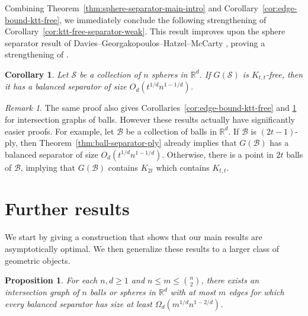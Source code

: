 \documentclass[11pt, reqno]{amsart}
\theoremstyle{plain}
\newtheorem{corollary}[theorem]{Corollary}
\newtheorem{proposition}[theorem]{Proposition}
\theoremstyle{definition}
\theoremstyle{remark}
\newtheorem*{remark}{Remark}
\numberwithin{theorem}{section}
\numberwithin{equation}{section}
\newcommand{\R}{\mathbb R}
\newcommand{\fB}{\mathcal B}
\newcommand{\fS}{\mathcal S}
\begin{document}
Combining Theorem~\ref{thm:sphere-separator-main-intro} and Corollary~\ref{cor:edge-bound-ktt-free}, we immediately conclude the following strengthening of Corollary~\ref{cor:ktt-free-separator-weak}. This result improves upon the sphere separator result of Davies--Georgakopoulos--Hatzel--McCarty \cite[Theorem 1]{DGHM25}, proving a strengthening of \cite[Conjecture 20]{DGHM25}.

\begin{corollary}
\label{cor:ktt-free-separator}
Let $\fS$ be a collection of $n$ spheres in $\R^d$. If $G(\fS)$ is $K_{t,t}$-free, then it has a balanced separator of size $O_d(t^{1/d}n^{1-1/d})$.
\end{corollary}

\begin{remark}
The same proof also gives Corollaries~\ref{cor:edge-bound-ktt-free} and \ref{cor:ktt-free-separator} for intersection graphs of balls. However these results actually have significantly easier proofs. For example, let $\fB$ be a collection of balls in $\R^d$. If $\fB$ is $(2t-1)$-ply, then Theorem~\ref{thm:ball-separator-ply} already implies that $G(\fB)$ has a balanced separator of size $O_d(t^{1/d}n^{1-1/d})$. Otherwise, there is a point in $2t$ balls of $\fB$, implying that $G(\fB)$ contains $K_{2t}$ which contains $K_{t,t}$.
\end{remark}

\section{Further results}
\label{sec:further}

We start by giving a construction that shows that our main results are asymptotically optimal. We then generalize these results to a larger class of geometric objects.

\begin{proposition}
\label{prop:lower-bound}
For each $n,d\geq 1$ and $n\leq m\leq \binom n2$, there exists an intersection graph of $n$ balls or spheres in $\R^d$ with at most $m$ edges for which every balanced separator has size at least $\Omega_d(m^{1/d}n^{1-2/d})$.
\end{proposition}
\end{document}
